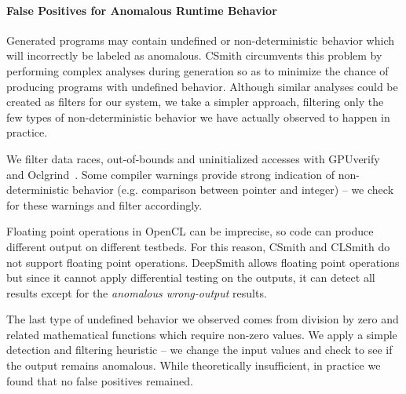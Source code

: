 \paragraph{False Positives for Anomalous Runtime Behavior}\label{subsec:discussions}
Generated programs may contain undefined or non-deterministic behavior which will incorrectly be labeled as anomalous. CSmith circumvents this problem by performing  complex analyses during generation so as to minimize the chance of producing programs with undefined behavior. Although similar analyses could be created as filters for our system, we take a simpler approach, filtering only the few types of non-deterministic behavior we have actually observed to happen in practice.

We filter data races, out-of-bounds and uninitialized accesses with GPUverify~\cite{Betts2012} and Oclgrind~\cite{Price2015}. Some compiler warnings provide strong indication of non-deterministic behavior (e.g. comparison between pointer and integer) -- we check for these warnings and filter accordingly.


Floating point operations in OpenCL can be imprecise, so code can produce different output on different testbeds. For this reason, CSmith and CLSmith do not support floating point operations. DeepSmith allows floating point operations but since it cannot apply differential testing on the outputs, it can detect all results except for the \emph{anomalous wrong-output} results.

The last type of undefined behavior we observed comes from division by zero and related mathematical functions which require non-zero values. We apply a simple detection and filtering heuristic -- we change the input values and check to see if the output remains anomalous. While theoretically insufficient, in practice we found that no false positives remained.



